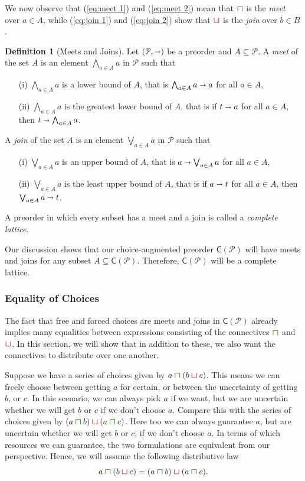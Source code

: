 \documentclass[12pt]{article}
\theoremstyle{definition}
\newtheorem{definition}{Definition}[section]
\theoremstyle{plain}
\theoremstyle{plain}
\theoremstyle{plain}
\theoremstyle{plain}
\theoremstyle{remark}
\theoremstyle{remark}
\newcommand{\mc}[1]{\mathcal{#1}}
\newcommand{\sub}{\subseteq}
\newcommand{\csqcap}{\color{OliveGreen}\bm{\sqcap}\color{Black}}
\newcommand{\csqcup}{\color{BrickRed}\bm{\sqcup}\color{Black}}
\begin{document}
We now observe that (\ref{eq:meet 1}) and (\ref{eq:meet 2}) mean that $\csqcap$ is the \emph{meet} over $a \in A$, while (\ref{eq:join 1}) and (\ref{eq:join 2}) show that $\csqcup$ is the \emph{join} over $b \in B$.

\begin{definition}[Meets and Joins]\label{def:meets joins}
	Let $(\mc{P},\shortrightarrow)$ be a preorder and $A \sub \mc{P}$. A \emph{meet} of the set $A$ is an element $\bigwedge_{a \in A} a$ in $\mc{P}$ such that
	\begin{itemize}
		\item[(i)] $\bigwedge_{a \in A} a$ is a lower bound of $A$, that is $\bigwedge_{a \in A} a  \shortrightarrow a$ for all $a \in A$,
		\item[(ii)] $\bigwedge_{a \in A} a$ is the greatest lower bound of $A$, that is if $t \shortrightarrow a$ for all $a \in A$, then $t \shortrightarrow \bigwedge_{a \in A} a$.
	\end{itemize}
	A \emph{join} of the set $A$ is an element $\bigvee_{a \in A} a$ in $\mc{P}$ such that
	\begin{itemize}
		\item[(i)] $\bigvee_{a \in A} a$ is an upper bound of $A$, that is $a  \shortrightarrow \bigvee_{a \in A} a$ for all $a \in A$,
		\item[(ii)] $\bigvee_{a \in A} a$ is the least upper bound of $A$, that is if $a \shortrightarrow t$ for all $a \in A$, then $\bigvee_{a \in A} a \shortrightarrow t$.
	\end{itemize}
	A preorder in which every subset has a meet and a join is called a \emph{complete lattice}.
\end{definition}

Our discussion shows that our choice-augmented preorder $\mathsf{C}(\mc{P})$ will have meets and joins for any subset $A \sub \mathsf{C}(\mc{P})$. Therefore, $\mathsf{C}(\mc{P})$ will be a complete lattice.

\subsubsection{Equality of Choices}\label{sec:intr self}
The fact that free and forced choices are meets and joins in $\mathsf{C}(\mc{P})$ already implies many equalities between expressions consisting of the connectives $\csqcap$ and $\csqcup$. In this section, we will show that in addition to these, we also want the connectives to distribute over one another.

Suppose we have a series of choices given by $a \csqcap (b \csqcup c)$. This means we can freely choose between getting $a$ for certain, or between the uncertainty of getting $b$, or $c$. In this scenario, we can always pick $a$ if we want, but we are uncertain whether we will get $b$ or $c$ if we don't choose $a$. Compare this with the series of choices given by $(a \csqcap b) \csqcup (a \csqcap c)$. Here too we can always guarantee $a$, but are uncertain whether we will get $b$ or $c$, if we don't choose $a$. In terms of which resources we can guarantee, the two formulations are equivalent from our perspective. Hence, we will assume the following distributive law $$a \csqcap (b \csqcup c) = (a \csqcap b) \csqcup (a \csqcap c).$$
\end{document}

